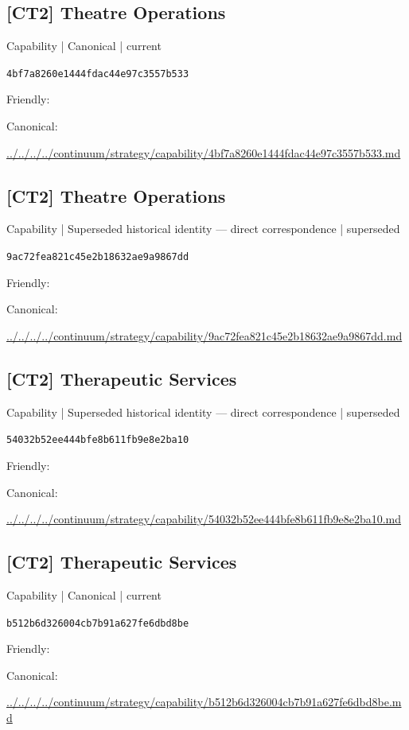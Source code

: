 \documentclass[10pt,a4paper]{article}
\begin{document}
\subsection*{[CT2] Theatre Operations}
{\small Capability | Canonical | current}\par
\texttt{4bf7a8260e1444fdac44e97c3557b533}\par
Friendly: \par
Canonical: \par
{\footnotesize\url{../../../../continuum/strategy/capability/4bf7a8260e1444fdac44e97c3557b533.md}}\par
\subsection*{[CT2] Theatre Operations}
{\small Capability | Superseded historical identity — direct correspondence | superseded}\par
\texttt{9ac72fea821c45e2b18632ae9a9867dd}\par
Friendly: \par
Canonical: \par
{\footnotesize\url{../../../../continuum/strategy/capability/9ac72fea821c45e2b18632ae9a9867dd.md}}\par
\subsection*{[CT2] Therapeutic Services}
{\small Capability | Superseded historical identity — direct correspondence | superseded}\par
\texttt{54032b52ee444bfe8b611fb9e8e2ba10}\par
Friendly: \par
Canonical: \par
{\footnotesize\url{../../../../continuum/strategy/capability/54032b52ee444bfe8b611fb9e8e2ba10.md}}\par
\subsection*{[CT2] Therapeutic Services}
{\small Capability | Canonical | current}\par
\texttt{b512b6d326004cb7b91a627fe6dbd8be}\par
Friendly: \par
Canonical: \par
{\footnotesize\url{../../../../continuum/strategy/capability/b512b6d326004cb7b91a627fe6dbd8be.md}}\par
\end{document}
